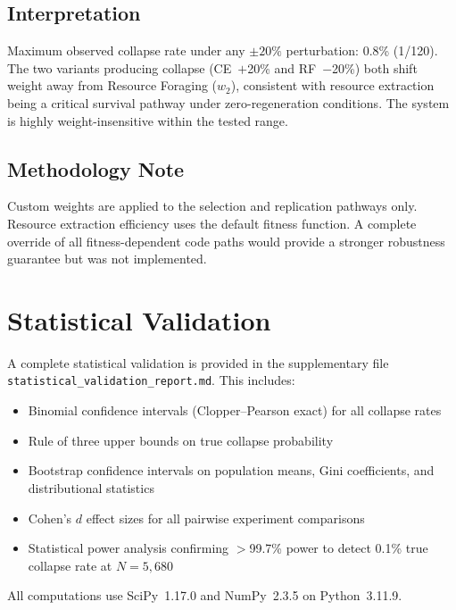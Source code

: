 \documentclass[11pt,a4paper]{article}
\begin{document}
\subsection{Interpretation}

Maximum observed collapse rate under any $\pm 20\%$ perturbation: 0.8\% (1/120). The two variants producing collapse (CE~$+$20\% and RF~$-$20\%) both shift weight away from Resource Foraging ($w_2$), consistent with resource extraction being a critical survival pathway under zero-regeneration conditions. The system is highly weight-insensitive within the tested range.

\subsection{Methodology Note}

Custom weights are applied to the selection and replication pathways only. Resource extraction efficiency uses the default fitness function. A complete override of all fitness-dependent code paths would provide a stronger robustness guarantee but was not implemented.

\section{Statistical Validation}\label{app:stats}

A complete statistical validation is provided in the supplementary file \texttt{statistical\_validation\_report.md}. This includes:
\begin{itemize}[nosep]
  \item Binomial confidence intervals (Clopper--Pearson exact) for all collapse rates
  \item Rule of three upper bounds on true collapse probability
  \item Bootstrap confidence intervals on population means, Gini coefficients, and distributional statistics
  \item Cohen's $d$ effect sizes for all pairwise experiment comparisons
  \item Statistical power analysis confirming $>$99.7\% power to detect 0.1\% true collapse rate at $N = 5{,}680$
\end{itemize}

All computations use SciPy~1.17.0 and NumPy~2.3.5 on Python~3.11.9.
\end{document}
